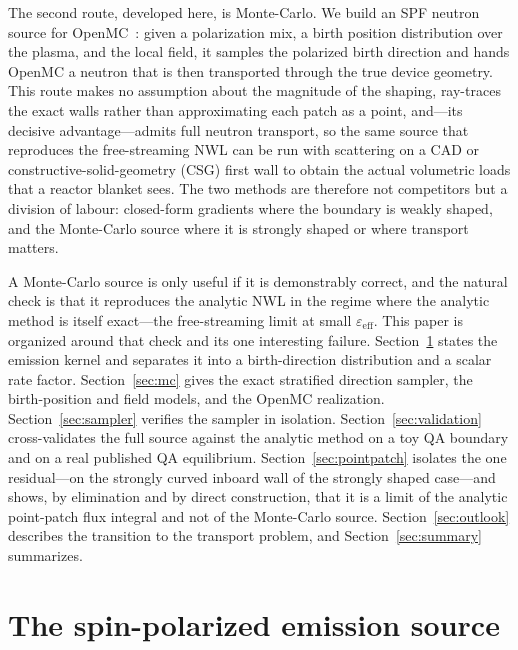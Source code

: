 \documentclass[11pt]{article}
\newcommand{\eps}{\varepsilon}
\newcommand{\epseff}{\eps_{\mathrm{eff}}}
\begin{document}
The second route, developed here, is Monte-Carlo. We build an SPF neutron source for
OpenMC~\cite{romano2015}: given a polarization mix, a birth position distribution over the
plasma, and the local field, it samples the polarized birth direction and hands OpenMC a
neutron that is then transported through the true device geometry. This route makes no
assumption about the magnitude of the shaping, ray-traces the exact walls rather than
approximating each patch as a point, and---its decisive advantage---admits full neutron
transport, so the same source that reproduces the free-streaming NWL can be run with
scattering on a CAD or constructive-solid-geometry (CSG) first wall to obtain the actual
volumetric loads that a reactor blanket sees. The two methods are therefore not
competitors but a division of labour: closed-form gradients where the boundary is weakly
shaped, and the Monte-Carlo source where it is strongly shaped or where transport matters.

A Monte-Carlo source is only useful if it is demonstrably correct, and the natural check
is that it reproduces the analytic NWL in the regime where the analytic method is itself
exact---the free-streaming limit at small $\epseff$. This paper is organized around that
check and its one interesting failure. Section~\ref{sec:source} states the emission kernel
and separates it into a birth-direction distribution and a scalar rate factor.
Section~\ref{sec:mc} gives the exact stratified direction sampler, the birth-position and
field models, and the OpenMC realization. Section~\ref{sec:sampler} verifies the sampler
in isolation. Section~\ref{sec:validation} cross-validates the full source against the
analytic method on a toy QA boundary and on a real published QA equilibrium.
Section~\ref{sec:pointpatch} isolates the one residual---on the strongly curved inboard
wall of the strongly shaped case---and shows, by elimination and by direct construction,
that it is a limit of the analytic point-patch flux integral and not of the Monte-Carlo
source. Section~\ref{sec:outlook} describes the transition to the transport problem, and
Section~\ref{sec:summary} summarizes.

\section{The spin-polarized emission source}
\label{sec:source}
\end{document}

